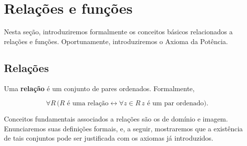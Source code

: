 \section{Relações e funções}\label{sec:relacoesEFuncoes}
Nesta seção, introduziremos formalmente os conceitos básicos relacionados a relações e funções.
Oportunamente, introduziremos o Axioma da Potência.
\subsection{Relações}\label{subsec:relacoes}
\begin{definition}[$\BST$]\label{def:relacao}
    Uma \textbf{relação} é um conjunto de pares ordenados.
    Formalmente,

    \[
        \forall R\, \bigl(R \text{ é uma relação} \leftrightarrow \forall z \in R\, z \text{ é um par ordenado}\bigr).
    \]
\end{definition}

Conceitos fundamentais associados a relações são os de domínio e imagem.
Enunciaremos suas definições formais, e, a seguir, mostraremos que a existência de tais conjuntos pode ser justificada com os axiomas já introduzidos.

